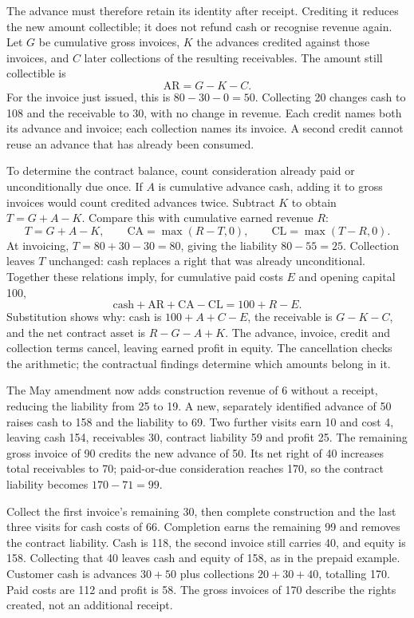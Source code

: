 The advance must therefore retain its identity after receipt. Crediting it
reduces the new amount collectible; it does not refund cash or recognise
revenue again. Let \(G\) be cumulative gross invoices, \(K\) the advances
credited against those invoices, and \(C\) later collections of the resulting
receivables. The amount still collectible is
\[
  \mathrm{AR}=G-K-C.
\]
For the invoice just issued, this is \(80-30-0=50\). Collecting 20 changes
cash to 108 and the receivable to 30, with no change in revenue. Each credit
names both its advance and invoice; each collection names its invoice. A
second credit cannot reuse an advance that has already been consumed.

To determine the contract balance, count consideration already paid or
unconditionally due once. If \(A\) is cumulative advance cash, adding it to
gross invoices would count credited advances twice. Subtract \(K\) to obtain
\(T=G+A-K\). Compare this with cumulative earned revenue \(R\):
\[
  T=G+A-K,\qquad
  \mathrm{CA}=\max(R-T,0),\qquad
  \mathrm{CL}=\max(T-R,0).
\]
At invoicing, \(T=80+30-30=80\), giving the liability \(80-55=25\).
Collection leaves \(T\) unchanged: cash replaces a right that was already
unconditional. Together these relations imply, for cumulative paid costs
\(E\) and opening capital 100,
\[
  \text{cash}+\mathrm{AR}+\mathrm{CA}-\mathrm{CL}
       =100+R-E.
\]
Substitution shows why: cash is \(100+A+C-E\), the receivable is
\(G-K-C\), and the net contract asset is \(R-G-A+K\). The advance,
invoice, credit and collection terms cancel, leaving earned profit in equity.
The cancellation checks the arithmetic; the contractual findings determine
which amounts belong in it.

The May amendment now adds construction revenue of 6 without a receipt,
reducing the liability from 25 to 19. A new, separately identified advance of
50 raises cash to 158 and the liability to 69. Two further visits earn 10
and cost 4, leaving cash 154, receivables 30, contract liability 59 and profit
25. The remaining gross invoice of 90 credits the new advance of 50. Its net
right of 40 increases total receivables to 70; paid-or-due consideration
reaches 170, so the contract liability becomes \(170-71=99\).

Collect the first invoice's remaining 30, then complete construction and the
last three visits for cash costs of 66. Completion earns the remaining 99 and
removes the contract liability. Cash is 118, the second invoice still carries
40, and equity is 158. Collecting that 40 leaves cash and equity of 158, as
in the prepaid example. Customer cash is advances \(30+50\) plus collections
\(20+30+40\), totalling 170. Paid costs are 112 and profit is 58. The gross
invoices of 170 describe the rights created, not an additional receipt.

